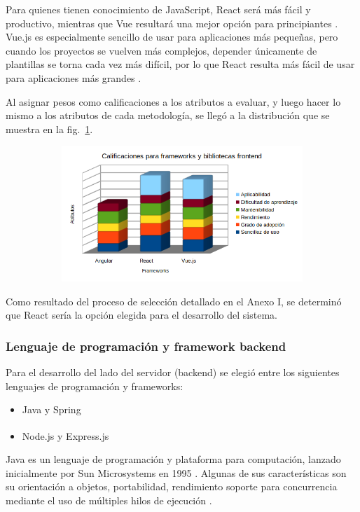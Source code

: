 \documentclass{article}
\begin{document}
Para quienes tienen conocimiento de JavaScript, React será más fácil y productivo, mientras que Vue resultará una mejor opción para principiantes \parencite{digitalya}. Vue.js es especialmente sencillo de usar para aplicaciones más pequeñas, pero cuando los proyectos se vuelven más complejos, depender únicamente de plantillas se torna cada vez más difícil, por lo que React resulta más fácil de usar para aplicaciones más grandes \parencite{stxnext}.

Al asignar pesos como calificaciones a los atributos a evaluar, y luego hacer lo mismo a los atributos de cada metodología, se llegó a la distribución que se muestra en la fig.~\ref{fig:frameworksFrontend}.
\begin{figure}[H]
	\caption{Calificaciones para frameworks frontend}
    \begin{subfigure}{1\textwidth}
	\includegraphics[width=1\textwidth]{calificaciones para frameworks frontend.png}
    \end{subfigure}
	\label{fig:frameworksFrontend}
\end{figure}
\vspace{-1.0\baselineskip}
Como resultado del proceso de selección detallado en el Anexo I, se determinó que React sería la opción elegida para el desarrollo del sistema.
\subsubsection{Lenguaje de programación y framework backend}
Para el desarrollo del lado del servidor (backend) se elegió entre los siguientes lenguajes de programación y frameworks:
\begin{itemize}
    \item Java y Spring
    \item Node.js\textsuperscript{\textregistered} y Express.js
\end{itemize}
Java es un lenguaje de programación y plataforma para computación, lanzado inicialmente por Sun Microsystems en 1995 \parencite{whatIsJava}. Algunas de sus características son su orientación a objetos, portabilidad, rendimiento soporte para concurrencia mediante el uso de múltiples hilos de ejecución \parencite{featuresJava}.
\end{document}
